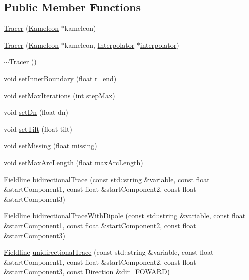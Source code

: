 \subsection*{Public Member Functions}
\begin{DoxyCompactItemize}
\item 
\hyperlink{classccmc_1_1_tracer_a16f3484aa70343874800adfce15b7d48}{Tracer} (\hyperlink{classccmc_1_1_kameleon}{Kameleon} $\ast$kameleon)
\item 
\hyperlink{classccmc_1_1_tracer_a6cd137b845ca56ef9a50bbb8e76ad231}{Tracer} (\hyperlink{classccmc_1_1_kameleon}{Kameleon} $\ast$kameleon, \hyperlink{classccmc_1_1_interpolator}{Interpolator} $\ast$\hyperlink{classccmc_1_1_tracer_ae7a4953e9ca43eb93535b869864f6062}{interpolator})
\item 
\hyperlink{classccmc_1_1_tracer_ac9c1fdded6293841a58a3f672b775577}{$\sim$\-Tracer} ()
\item 
void \hyperlink{classccmc_1_1_tracer_a8b67d175f78a67e8f9119a9b105bfb8b}{set\-Inner\-Boundary} (float r\-\_\-end)
\item 
void \hyperlink{classccmc_1_1_tracer_aecadbaf86210183e93561cfd994e5cb3}{set\-Max\-Iterations} (int step\-Max)
\item 
void \hyperlink{classccmc_1_1_tracer_ab487539d33afad7fb6642d4bd3ccc555}{set\-Dn} (float dn)
\item 
void \hyperlink{classccmc_1_1_tracer_aa729fd6391a148f9bad170a652ec6d7d}{set\-Tilt} (float tilt)
\item 
void \hyperlink{classccmc_1_1_tracer_a2b4ada2551d3d6db929f6f4b59fe6cb0}{set\-Missing} (float missing)
\item 
void \hyperlink{classccmc_1_1_tracer_a22c8cf8a9c801e38f7bd4fe8cc224f1c}{set\-Max\-Arc\-Length} (float max\-Arc\-Length)
\item 
\hyperlink{classccmc_1_1_fieldline}{Fieldline} \hyperlink{classccmc_1_1_tracer_a47783816bdcacaa27f0c4535bba42c1f}{bidirectional\-Trace} (const std\-::string \&variable, const float \&start\-Component1, const float \&start\-Component2, const float \&start\-Component3)
\item 
\hyperlink{classccmc_1_1_fieldline}{Fieldline} \hyperlink{classccmc_1_1_tracer_a15158cc5fe5eb9a0372d85b9d81d798d}{bidirectional\-Trace\-With\-Dipole} (const std\-::string \&variable, const float \&start\-Component1, const float \&start\-Component2, const float \&start\-Component3)
\item 
\hyperlink{classccmc_1_1_fieldline}{Fieldline} \hyperlink{classccmc_1_1_tracer_a3166d314066e3c83e935e01b37554e63}{unidirectional\-Trace} (const std\-::string \&variable, const float \&start\-Component1, const float \&start\-Component2, const float \&start\-Component3, const \hyperlink{classccmc_1_1_tracer_a2c914b28e2e205cb1a7c01f2941fcae2}{Direction} \&dir=\hyperlink{classccmc_1_1_tracer_a2c914b28e2e205cb1a7c01f2941fcae2a133381f1178a2affb0f1c79a67b45e52}{F\-O\-W\-A\-R\-D})

\end{DoxyCompactItemize}

